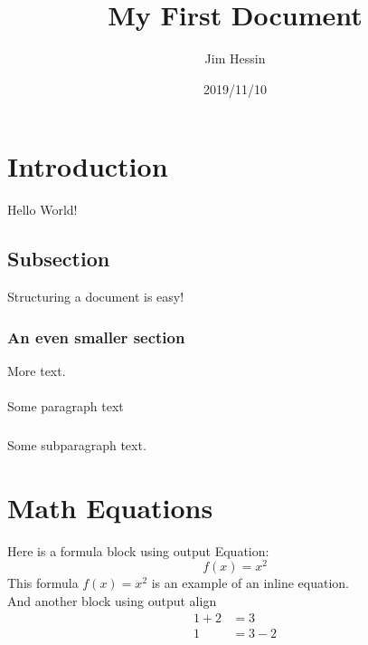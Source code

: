 \documentclass{article}
\title{My First Document}
\date{2019/11/10}
\author{Jim Hessin}
\begin{document}
  \newpage

  \section{Introduction}

  Hello World!

  \subsection{Subsection}

  Structuring a document is easy!

  \subsubsection{An even smaller section}

  More text.

  \paragraph{}

  Some paragraph text

  \subparagraph{}

  Some subparagraph text.

  \section{Math Equations}

  Here is a formula block
  using output Equation:
  \begin{equation*}
    f(x) = x^2
  \end{equation*}
  This formula $f(x) = x^2$ is an example of an inline equation. \\
  And another block using output align
  \begin{align*}
    1 + 2 &= 3 \\
    1 &= 3 - 2
  \end{align*}
\end{document}
